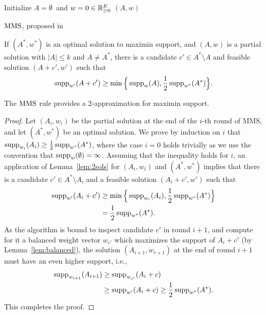 \begin{algorithm}[htb]
\SetAlgoLined
{}
Initialize $A=\emptyset$\ and $w=0\in \mathbb{R}_{\geq 0}^E$\;
\Return $(A,w)$\;
\caption{$\operatorname{MMS}$, proposed in~\cite{sanchez2016maximin}}
\label{alg:mms}
\end{algorithm}

\begin{lemma}\label{lem:2sols}
If $(A^*, w^*)$ is an optimal solution to maximin support, and $(A,w)$ is a partial solution with $|A|\leq k$ and $A\neq A^*$, there is a candidate $c'\in A^*\setminus A$ and feasible solution $(A+c', w')$ such that 
$$\operatorname{supp}_{w'}(A+c')\geq \min\Big\{\operatorname{supp}_w(A), \frac{1}{2} \operatorname{supp}_{w^*}(A^*)\Big\}.$$
\end{lemma}

\begin{theorem}\label{thm:mms}
The $\operatorname{MMS}$ rule provides a 2-approximation for maximin support.
\end{theorem}

\begin{proof}
Let $(A_i, w_i)$ be the partial solution at the end of the $i$-th round of MMS, and let $(A^*, w^*)$ be an optimal solution. 
We prove by induction on $i$ that $\operatorname{supp}_{w_i}(A_i)\geq \frac{1}{2}\operatorname{supp}_{w^*}(A^*)$, where the case $i=0$ holds trivially as we use the convention that $\operatorname{supp}_w(\emptyset)=\infty$.
Assuming that the inequality holds for $i$, an application of Lemma~\ref{lem:2sols} for $(A_i, w_i)$ and $(A^*, w^*)$ implies that there is a candidate $c'\in A^*\setminus A_i$ and a feasible solution $(A_i+c', w')$ such that 
\begin{align*}
\operatorname{supp}_{w'}(A_i+c') &\geq \min\Big\{\operatorname{supp}_{w_i}(A_i), \frac{1}{2} \operatorname{supp}_{w^*}(A^*)\Big\} \\
 &= \frac{1}{2} \operatorname{supp}_{w^*}(A^*).
\end{align*}
%
As the algorithm is bound to inspect candidate $c'$ in round $i+1$, and compute for it a balanced weight vector $w_{c'}$ which maximizes the support of $A_i+c'$ (by Lemma~\ref{lem:balanced}), the solution $(A_{i+1}, w_{r+1})$ at the end of round $i+1$ must have an even higher support, i.e., %
\begin{align*}
\operatorname{supp}_{w_{i+1}}(A_{i+1}) &\geq \operatorname{supp}_{w_{c'}}(A_i+c) \\ 
  &\geq \operatorname{supp}_{w'}(A_i+c) \geq \frac{1}{2} \operatorname{supp}_{w^*}(A^*).
\end{align*}
%
This completes the proof.
\end{proof}

